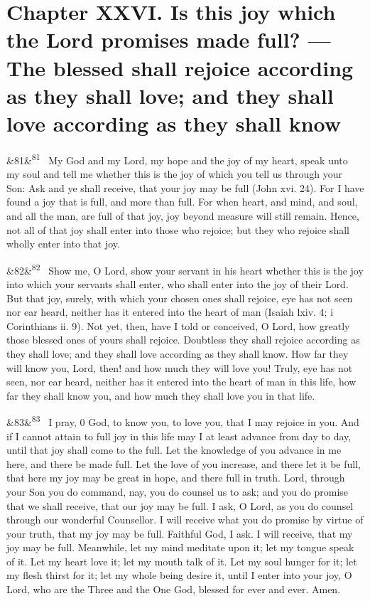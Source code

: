\documentclass[12pt]{article}
\newcommand{\para}[1][]{\par\noindent\ifx&#1&\else\textsuperscript{\footnotesize #1}~\fi}
\begin{document}
\section*{Chapter XXVI. Is this joy which the Lord promises made full? ---The blessed shall rejoice according as they shall love; and they shall love according as they shall know}

\para[81] My God and my Lord, my hope and the joy of my heart, speak unto my soul and tell me whether this is the joy of which you tell us through your Son: Ask and ye shall receive, that your joy may be full (John xvi. 24). For I have found a joy that is full, and more than full. For when heart, and mind, and soul, and all the man, are full of that joy, joy beyond measure will still remain. Hence, not all of that joy shall enter into those who rejoice; but they who rejoice shall wholly enter into that joy.

\para[82] Show me, O Lord, show your servant in his heart whether this is the joy into which your servants shall enter, who shall enter into the joy of their Lord. But that joy, surely, with which your chosen ones shall rejoice, eye has not seen nor ear heard, neither has it entered into the heart of man (Isaiah lxiv. 4; i Corinthians ii. 9). Not yet, then, have I told or conceived, O Lord, how greatly those blessed ones of yours shall rejoice. Doubtless they shall rejoice according as they shall love; and they shall love according as they shall know. How far they will know you, Lord, then! and how much they will love you! Truly, eye has not seen, nor ear heard, neither has it entered into the heart of man in this life, how far they shall know you, and how much they shall love you in that life.

\para[83] I pray, 0 God, to know you, to love you, that I may rejoice in you. And if I cannot attain to full joy in this life may I at least advance from day to day, until that joy shall come to the full. Let the knowledge of you advance in me here, and there be made full. Let the love of you increase, and there let it be full, that here my joy may be great in hope, and there full in truth. Lord, through your Son you do command, nay, you do counsel us to ask; and you do promise that we shall receive, that our joy may be full. I ask, O Lord, as you do counsel through our wonderful Counsellor. I will receive what you do promise by virtue of your truth, that my joy may be full. Faithful God, I ask. I will receive, that my joy may be full. Meanwhile, let my mind meditate upon it; let my tongue speak of it. Let my heart love it; let my mouth talk of it. Let my soul hunger for it; let my flesh thirst for it; let my whole being desire it, until I enter into your joy, O Lord, who are the Three and the One God, blessed for ever and ever. Amen.
\end{document}
